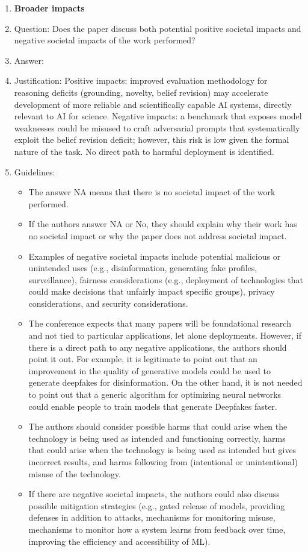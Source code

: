 \documentclass{article}
\theoremstyle{definition}
\begin{document}
\begin{enumerate}
\item {\bf Broader impacts}
    \item[] Question: Does the paper discuss both potential positive societal impacts and negative societal impacts of the work performed?
    \item[] Answer: \answerYes{}
    \item[] Justification: Positive impacts: improved evaluation methodology for reasoning deficits (grounding, novelty, belief revision) may accelerate development of more reliable and scientifically capable AI systems, directly relevant to AI for science. Negative impacts: a benchmark that exposes model weaknesses could be misused to craft adversarial prompts that systematically exploit the belief revision deficit; however, this risk is low given the formal nature of the task. No direct path to harmful deployment is identified.
    \item[] Guidelines:
    \begin{itemize}
        \item The answer NA means that there is no societal impact of the work performed.
        \item If the authors answer NA or No, they should explain why their work has no societal impact or why the paper does not address societal impact.
        \item Examples of negative societal impacts include potential malicious or unintended uses (e.g., disinformation, generating fake profiles, surveillance), fairness considerations (e.g., deployment of technologies that could make decisions that unfairly impact specific groups), privacy considerations, and security considerations.
        \item The conference expects that many papers will be foundational research and not tied to particular applications, let alone deployments. However, if there is a direct path to any negative applications, the authors should point it out. For example, it is legitimate to point out that an improvement in the quality of generative models could be used to generate deepfakes for disinformation. On the other hand, it is not needed to point out that a generic algorithm for optimizing neural networks could enable people to train models that generate Deepfakes faster.
        \item The authors should consider possible harms that could arise when the technology is being used as intended and functioning correctly, harms that could arise when the technology is being used as intended but gives incorrect results, and harms following from (intentional or unintentional) misuse of the technology.
        \item If there are negative societal impacts, the authors could also discuss possible mitigation strategies (e.g., gated release of models, providing defenses in addition to attacks, mechanisms for monitoring misuse, mechanisms to monitor how a system learns from feedback over time, improving the efficiency and accessibility of ML).
    \end{itemize}
    

\end{enumerate}
\end{document}
